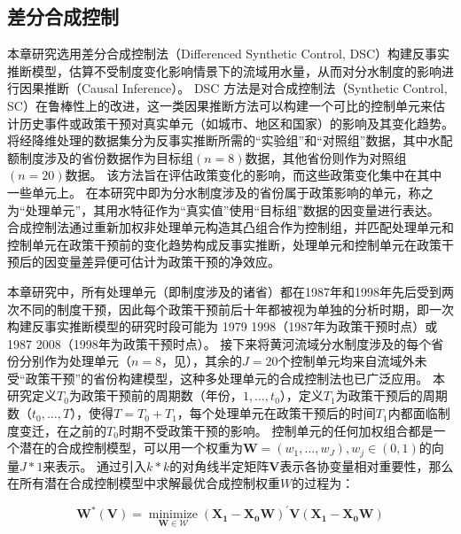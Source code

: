 \subsection{差分合成控制}\label{sec:DSC}

本章研究选用差分合成控制法（Differenced Synthetic Control, DSC）构建反事实推断模型，估算不受制度变化影响情景下的流域用水量，从而对分水制度的影响进行因果推断（Causal Inference）。
DSC 方法是对合成控制法（Synthetic Control, SC）在鲁棒性上的改进\cite{billmeier2013, smith2015}，这一类因果推断方法可以构建一个可比的控制单元来估计历史事件或政策干预对真实单元（如城市、地区和国家）的影响及其变化趋势\cite{abadie2010, abadie2015, hill2021}。
将经降维处理的数据集分为反事实推断所需的“实验组”和“对照组”数据，其中水配额制度涉及的省份数据作为目标组$(n=8)$数据，其他省份则作为对照组$(n=20)$数据。
该方法旨在评估政策变化的影响，而这些政策变化集中在其中一些单元上。
在本研究中即为分水制度涉及的省份属于政策影响的单元，称之为“处理单元”，其用水特征作为“真实值”使用“目标组”数据的因变量进行表达。
合成控制法通过重新加权非处理单元构造其凸组合作为控制组，并匹配处理单元和控制单元在政策干预前的变化趋势构成反事实推断，处理单元和控制单元在政策干预后的因变量差异便可估计为政策干预的净效应。

本章研究中，所有处理单元（即制度涉及的诸省）都在1987年和1998年先后受到两次不同的制度干预，因此每个政策干预前后十年都被视为单独的分析时期，即一次构建反事实推断模型的研究时段可能为 1979 \textendash{} 1998（1987年为政策干预时点）或 1987 \textendash{} 2008（1998年为政策干预时点）。
接下来将黄河流域分水制度涉及的每个省份分别作为处理单元（$n=8$，见），其余的$J=20$个控制单元均来自流域外未受“政策干预”的省份构建模型，这种多处理单元的合成控制法也已广泛应用\cite{abadie2021}。
本研究定义$T_0$为政策干预前的周期数（年份，$1,\ldots,t_0$），定义$T_1$为政策干预后的周期数（$t_0,\ldots,T$），使得$T = T_0+ T_1$，每个处理单元在政策干预后的时间$T_1$内都面临制度变迁，在之前的$T_0$时期不受政策干预的影响。
控制单元的任何加权组合都是一个潜在的合成控制模型，可以用一个权重为$\mathbf{W} = (w_{1},\ldots,w_{J}), w_j \in (0, 1)$的向量$J * 1$来表示。
通过引入$k * k$的对角线半定矩阵$\mathbf{V}$表示各协变量相对重要性，那么在所有潜在合成控制模型中求解最优合成控制权重$W$的过程为：

\begin{equation}
    \mathbf{W^{*}(V)}=\underset{\mathbf{W} \in \mathcal{W}}{\operatorname{minimize}}{\left(\mathbf{X}_{\mathbf{1}}-\mathbf{X}_{\mathbf{0}} \mathbf{W}\right)}^{\prime} {\mathbf{V}}{\left(\mathbf{X}_{\mathbf{1}}-\mathbf{X}_{\mathbf{0}} \mathbf{W}\right)}
\end{equation}

